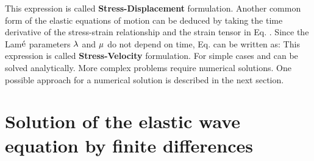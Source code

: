 This expression is called {\bf{Stress-Displacement}} formulation. Another common form of the elastic equations of motion can be deduced by taking the time derivative of the stress-strain relationship and the strain tensor in Eq. . Since the Lam$\acute{\rm e}$ parameters $\rm{\lambda}$ and $\rm{\mu}$ do not depend on time, Eq.  can be written as:
This expression is called {\bf{Stress-Velocity}} formulation. For simple cases  and  can be solved analytically. More complex problems require numerical solutions. One possible approach for a numerical solution is described in the next section.
\section{Solution of the elastic wave equation by finite differences}\label{elastic_FD_Code}
